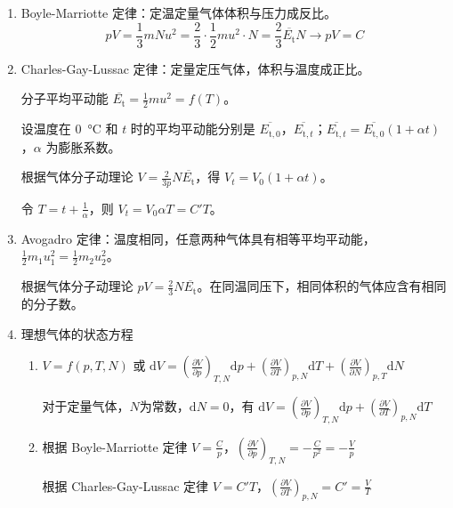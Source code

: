 \begin{enumerate}
    \item Boyle-Marriotte 定律：定温定量气体体积与压力成反比。
    \begin{equation*}
        pV = \frac13 m N u^2 = \frac23 \cdot \frac12 m u^2 \cdot N = \frac23 \overline{E_{\mathrm{t}}} N \longrightarrow pV = C
    \end{equation*}
    
    \item Charles-Gay-Lussac 定律：定量定压气体，体积与温度成正比。
    
    分子平均平动能 $\overline{E_{\mathrm{t}}} = \frac12 m u^2 = f(T)$。
    
    设温度在 \qty{0}{\degreeCelsius} 和 $t$ 时的平均平动能分别是 $\overline{E_{\mathrm{t},0}}$，$\overline{E_{\mathrm{t},t}}$；$\overline{E_{\mathrm{t},t}} = \overline{E_{\mathrm{t},0}}(1 + \alpha t)$，$\alpha$ 为膨胀系数。
    
    根据气体分子动理论 $V = \frac{2}{3p} N \overline{E_{\mathrm{t}}}$，得 $V_t = V_0(1 + \alpha t)$。
    
    令 $T = t + \frac{1}{\alpha}$，则 $V_t = V_0 \alpha T = C'T$。
    
    \item Avogadro 定律：温度相同，任意两种气体具有相等平均平动能，$\frac12 m_1 u_1^2 = \frac12 m_2 u_2^2$。
    
    根据气体分子动理论 $pV = \frac23 N \overline{E_{\mathrm{t}}}$。在同温同压下，相同体积的气体应含有相同的分子数。
    
    \item 理想气体的状态方程
    \begin{enumerate}
        \item $V = f(p, T, N)$ 或 $\mathrm{d}V = \left(\frac{\partial V}{\partial p}\right)_{T,N} \mathrm{d}p + \left(\frac{\partial V}{\partial T}\right)_{p,N} \mathrm{d}T + \left(\frac{\partial V}{\partial N}\right)_{p,T} \mathrm{d}N$
        
        对于定量气体，$N$为常数，$\mathrm{d}N = 0$，有 $\mathrm{d}V = \left(\frac{\partial V}{\partial p}\right)_{T,N} \mathrm{d}p + \left(\frac{\partial V}{\partial T}\right)_{p,N} \mathrm{d}T$
        
        \item 根据 Boyle-Marriotte 定律 $V = \frac{C}{p}$，$\left(\frac{\partial V}{\partial p}\right)_{T,N} = -\frac{C}{p^2} = -\frac{V}{p}$
        
        根据 Charles-Gay-Lussac 定律 $V = C'T$，$\left(\frac{\partial V}{\partial T}\right)_{p,N} = C' = \frac{V}{T}$
        

\end{enumerate}
\end{enumerate}

